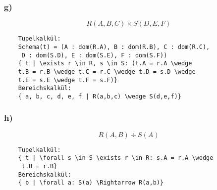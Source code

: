 \subsubsection{g)}
\[R(A,B,C)\times S(D,E,F)\]
\begin{verbatim}
    Tupelkalkül:
    Schema(t) = (A : dom(R.A), B : dom(R.B), C : dom(R.C),
     D : dom(S.D), E : dom(S.E), F : dom(S.F))
    { t | \exists r \in R, s \in S: (t.A = r.A \wedge 
    t.B = r.B \wedge t.C = r.C \wedge t.D = s.D \wedge
    t.E = s.E \wedge t.F = s.F)}
    Bereichskalkül:
    { a, b, c, d, e, f | R(a,b,c) \wedge S(d,e,f)}
\end{verbatim}

\subsubsection{h)}
\[R(A,B) \div S(A)\]
\begin{verbatim}
    Tupelkalkül:
    { t | \forall s \in S \exists r \in R: s.A = r.A \wedge
     t.B = r.B}
    Bereichskalkül:
    { b | \forall a: S(a) \Rightarrow R(a,b)}
\end{verbatim}